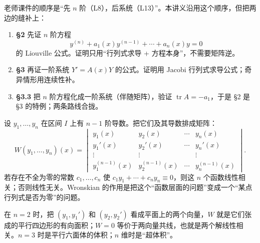 \documentclass[11pt]{ctexart}
\let\orighdr\hdr
\renewcommand{\hdr}[2]{\needspace{12\baselineskip}\orighdr{#1}{#2}}
\let\origsubhdr\subhdr
\renewcommand{\subhdr}[1]{\needspace{3\baselineskip}\origsubhdr{#1}}
\newcommand{\tr}{\operatorname{tr}}
\begin{document}

老师课件的顺序是“先 $n$ 阶（L8），后系统（L13）”。本讲义沿用这个顺序，但把两边的缝补上：

\begin{enumerate}
  \item \textbf{§2} 先证 $n$ 阶方程
  \[
  y^{(n)}+a_1(x)y^{(n-1)}+\cdots+a_n(x)y=0
  \]
  的 Liouville 公式。证明只用“行列式求导 + 方程本身”，不需要矩阵逆。
  \item \textbf{§3} 再证一阶系统 $Y'=A(x)Y$ 的公式。证明用 Jacobi 行列式求导公式；奇异情形用连续性补。
  \item \textbf{§3.3} 把 $n$ 阶方程化成一阶系统（伴随矩阵），验证 $\tr A=-a_1$，于是 §2 是 §3 的特例；两条路线合拢。
\end{enumerate}



设 $y_1,\dots,y_n$ 在区间 $I$ 上有 $n-1$ 阶导数。把它们及其导数排成矩阵：
\[
W(y_1,\dots,y_n)(x)=
\begin{vmatrix}
y_1(x)&y_2(x)&\cdots&y_n(x)\\
y_1'(x)&y_2'(x)&\cdots&y_n'(x)\\
\vdots&\vdots&&\vdots\\
y_1^{(n-1)}(x)&y_2^{(n-1)}(x)&\cdots&y_n^{(n-1)}(x)
\end{vmatrix}.
\]
若存在不全为零的常数 $c_1,\dots,c_n$ 使 $c_1y_1+\cdots+c_ny_n\equiv0$，则这 $n$ 个函数线性相关；否则线性无关。Wronskian 的作用是把这个“函数层面的问题”变成一个“某点行列式是否为零”的问题。


在 $n=2$ 时，把 $(y_1,y_1')$ 和 $(y_2,y_2')$ 看成平面上的两个向量，$W$ 就是它们张成的平行四边形的有向面积；$W=0$ 等价于两向量共线，也就是两个解线性相关。$n=3$ 时是平行六面体的体积；$n$ 维时是“超体积”。
\end{document}
